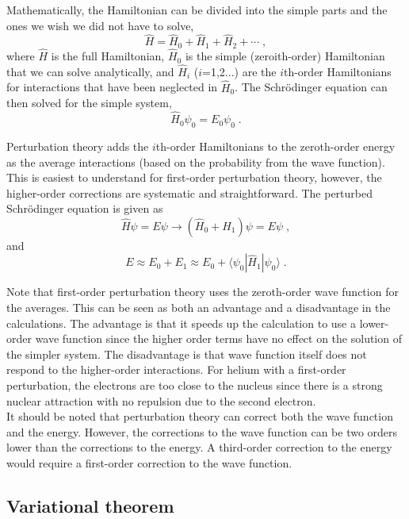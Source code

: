 \documentclass[12pt]{report}
\begin{document}
Mathematically, the Hamiltonian can be divided into the simple parts and the
ones we wish we did not have to solve,
\begin{equation}
 \hat H = \hat H_0+\hat H_1+\hat H_2+\cdots \; ,
\end{equation}
where $\hat H$ is the full Hamiltonian, $\hat H_0$ is the simple
(zeroith-order) Hamiltonian that we can solve analytically, and $\hat H_i$
($i$=1,2...) are the $i$th-order Hamiltonians for interactions that have been
neglected in $\hat H_0$.
The Schr\"{o}dinger equation can then solved for the simple system,
\begin{equation}
 \hat H_0\psi_0=E_0\psi_0 \; .
\end{equation}

Perturbation theory adds the $i$th-order Hamiltonians to the zeroth-order
energy as the average interactions (based on the probability from the
wave function).
This is easiest to understand for first-order perturbation theory, however,
the higher-order corrections are systematic and straightforward.
The perturbed Schr\"{o}dinger equation is given as
\begin{equation}
 \hat H\psi=E\psi \to (\hat H_0 + \hat H_1)\psi = E\psi \; ,
\end{equation}
and
\begin{equation}
 E \approx E_0 + E_1 \approx E_0 + \langle\psi_0|\hat H_1|\psi_0\rangle \; .
\end{equation}

Note that first-order perturbation theory uses the zeroth-order wave
function for the averages.
This can be seen as both an advantage and a disadvantage in the calculations.
The advantage is that it speeds up the calculation to use a lower-order wave
function since the higher order terms have no effect on the solution of the
simpler system.
The disadvantage is that wave function itself does not respond
to the higher-order interactions.
For helium with a first-order perturbation, the electrons are too close to the
nucleus since there is a strong nuclear attraction with no repulsion due to
the second electron. \\

It should be noted that perturbation theory can correct both the wave function
and the energy.
However, the corrections to the wave function can be two orders lower than the
corrections to the energy.
A third-order correction to the energy would require a first-order correction
to the wave function.

\subsection{Variational theorem}
\end{document}
